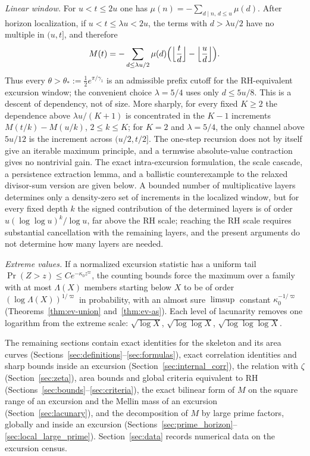 \documentclass[11pt]{amsart}
\numberwithin{equation}{section}
\theoremstyle{plain}
\theoremstyle{definition}
\theoremstyle{remark}
\begin{document}
\smallskip\noindent\emph{Linear window.} For $u<t\le2u$ one has
$\mu(n)=-\sum_{d\mid n,\,d\le u}\mu(d)$.  After horizon localization,
if $u<t\le\lambda u<2u$, the terms with $d>\lambda u/2$ have no multiple
in $(u,t]$, and therefore
\[
M(t)=-\sum_{d\le\lambda u/2}\mu(d)
\Bigl(\Bigl\lfloor\frac td\Bigr\rfloor-\Bigl\lfloor\frac ud\Bigr\rfloor\Bigr).
\]
Thus every $\theta>\theta_*:=\frac12e^{\pi/\gamma_1}$ is an admissible
prefix cutoff for the RH-equivalent excursion window; the convenient choice
$\lambda=5/4$ uses only $d\le5u/8$.  This is a descent of dependency, not
of size.  More sharply, for every fixed $K\ge2$ the dependence above
$\lambda u/(K+1)$ is concentrated in the $K-1$ increments
$M(t/k)-M(u/k)$, $2\le k\le K$; for $K=2$ and $\lambda=5/4$, the only channel
above $5u/12$ is the increment across $(u/2,t/2]$.  The one-step recursion
does not by itself give an iterable maximum principle, and a termwise
absolute-value contraction gives no nontrivial gain.  The exact
intra-excursion formulation, the scale cascade, a persistence extraction
lemma, and a ballistic counterexample to the relaxed divisor-sum version are
given below. A bounded number of multiplicative layers determines only a
density-zero set of increments in the localized window, but for every fixed
depth $k$ the signed contribution of the determined layers is of order
$u(\log\log u)^k/\log u$, far above the RH scale; reaching the RH scale
requires substantial cancellation with the remaining layers, and the present
arguments do not determine how many layers are needed.

\smallskip\noindent\emph{Extreme values.} If a normalized excursion statistic
has a uniform tail $\Pr(Z>z)\le Ce^{-\kappa_0z^\varpi}$, the counting bounds force the
maximum over a family with at most $\Lambda(X)$ members starting below $X$ to be
of order $(\log \Lambda(X))^{1/\varpi}$ in probability, with an almost sure $\limsup$ constant
$\kappa_0^{-1/\varpi}$ (Theorems~\ref{thm:ev-union} and~\ref{thm:ev-as}). Each level of
lacunarity removes one logarithm from the extreme scale:
$\sqrt{\log X}$, $\sqrt{\log\log X}$, $\sqrt{\log\log\log X}$.

\smallskip
The remaining sections contain exact identities for the skeleton and its area
curves (Sections~\ref{sec:definitions}--\ref{sec:formulas}), exact
correlation identities and sharp bounds inside an excursion
(Section~\ref{sec:internal_corr}), the relation with $\zeta$
(Section~\ref{sec:zeta}), area bounds and global criteria equivalent to RH
(Sections~\ref{sec:bounds}--\ref{sec:criteria}), the exact bilinear form of
$M$ on the square range of an excursion and the Mellin mass of an excursion
(Section~\ref{sec:lacunary}), and the decomposition of $M$ by large prime
factors, globally and inside an excursion
(Sections~\ref{sec:prime_horizon}--\ref{sec:local_large_prime}).
Section~\ref{sec:data} records numerical data on the excursion census.
\end{document}
